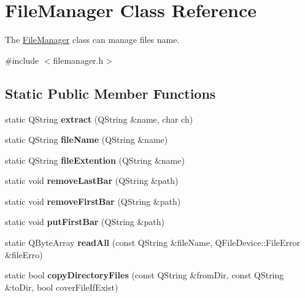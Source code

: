 \hypertarget{class_file_manager}{}\section{File\+Manager Class Reference}
\label{class_file_manager}


The \hyperlink{class_file_manager}{File\+Manager} class can manage file\textquotesingle{}s name.  




{\ttfamily \#include $<$filemanager.\+h$>$}

\subsection*{Static Public Member Functions}
\begin{DoxyCompactItemize}
\item 
\mbox{\label{class_file_manager_a56501ee7013e1d234ca11562635251c4}} 
static Q\+String {\bfseries extract} (Q\+String \&name, char ch)
\item 
\mbox{\label{class_file_manager_ab632757a3a632064b78c1c969a1638bd}} 
static Q\+String {\bfseries file\+Name} (Q\+String \&name)
\item 
\mbox{\label{class_file_manager_ac699c340c90b9d67a1bd508f37167580}} 
static Q\+String {\bfseries file\+Extention} (Q\+String \&name)
\item 
\mbox{\label{class_file_manager_a4da1540323986b6a1c6e3b4af98ecc97}} 
static void {\bfseries remove\+Last\+Bar} (Q\+String \&path)
\item 
\mbox{\label{class_file_manager_aa4c806c3e7a4073dec58e38856a23416}} 
static void {\bfseries remove\+First\+Bar} (Q\+String \&path)
\item 
\mbox{\label{class_file_manager_a4a40a32cba21d0d249327fbe95b0e4d2}} 
static void {\bfseries put\+First\+Bar} (Q\+String \&path)
\item 
\mbox{\label{class_file_manager_a6198ea2747916b1566d667f634fd5fa1}} 
static Q\+Byte\+Array {\bfseries read\+All} (const Q\+String \&file\+Name, Q\+File\+Device\+::\+File\+Error \&file\+Erro)
\item 
\mbox{\label{class_file_manager_acd4af1aaaa8a914fc50aeea2a22257da}} 
static bool {\bfseries copy\+Directory\+Files} (const Q\+String \&from\+Dir, const Q\+String \&to\+Dir, bool cover\+File\+If\+Exist)
\end{DoxyCompactItemize}



